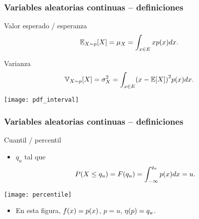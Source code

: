 \documentclass[table]{beamer}
\begin{document}
\begin{frame}
    \frametitle{Variables aleatorias continuas -- definiciones}
    \begin{block}{Valor esperado / esperanza}
        \begin{equation*}
            \expecteddist{X \sim p}{X} = \mu_{X} = \int_{x \in E} x \pdf{x} d x .
        \end{equation*}
    \end{block}
    \begin{block}{Varianza}
        \begin{equation*}
            \variancedist{X \sim p}{X} = \sigma^{2}_{X} = \int_{x \in E} \parens{x - \expected{X}}^{2} \pdf{x} d x .
        \end{equation*}
    \end{block}
    \begin{center}
        \texttt{[image: pdf\_interval]}
    \end{center}
\end{frame}

\begin{frame}
    \frametitle{Variables aleatorias continuas -- definiciones}
    \begin{block}{Cuantil / percentil}
        \begin{itemize}
            \item $q_{u}$ tal que
                \begin{equation*}
                    \prob{X \leq q_{u}} = \FF{q_{u}} = \int_{- \infty}^{q_{u}} \pdf{x} d x = u .
                \end{equation*}
        \end{itemize}
    \end{block}
    \begin{center}
        \texttt{[image: percentile]}
    \end{center}
    \begin{alertblock}{}
        \begin{itemize}
            \item En esta figura, $\ff{x} = \pdf{x}$, $p = u$, $\eta \parens{p} = q_{u}$.
        \end{itemize}
    \end{alertblock}
\end{frame}
\end{document}
